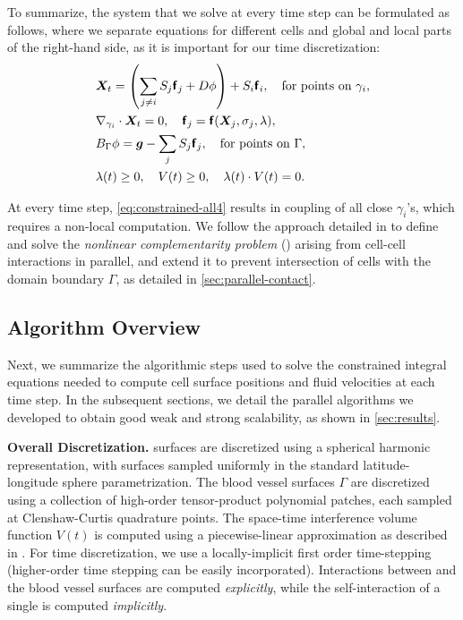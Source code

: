  To summarize, the system that we solve at every time step can be
 formulated as follows, where we separate equations for different
 cells and global and local parts of the right-hand side, as it is
 important for our time discretization:
%
%
\begin{align}
  &{\bm{X}}_t =  \left(\sum_{j\neq i} S_j \bm{\mathsf{f}}_j  + D \phi\right) +  S_i \bm{\mathsf{f}}_i, \quad \mbox{for points on $\gamma_i$},
  \label{eq:constrained-all1}\\
  &\nabla_{\gamma_i} \cdot {\bm{X}}_t = 0,\quad    \bm{\mathsf{f}}_j = \bm{\mathsf{f}}({\bm{X}}_j,\sigma_j,\lambda),
  \label{eq:constrained-all2} \\
  &B_\Gamma \phi =  \bm{g}-\sum_{j} S_j \bm{\mathsf{f}}_j, \quad \mbox{for points on $\Gamma$},
  \label{eq:constrained-all3} \\
   &\lambda(t) \geq 0, \quad V(t) \geq 0, \quad \lambda(t) \cdot V(t) = 0.
  \label{eq:constrained-all4}
\end{align}

 At every time step, \eqref{eq:constrained-all4} results in 
coupling of all close $\gamma_i$'s, which requires a non-local computation. 
We follow the approach detailed in \cite{lu2018parallel, lu2017} to define and solve
the \textit{nonlinear complementarity problem} (\ncp) arising from cell-cell
interactions in parallel, and extend it to prevent intersection of cells
with the domain boundary $\Gamma$, as detailed in \cref{sec:parallel-contact}.


\subsection{Algorithm Overview\label{sec:alg_overview}}

Next, we summarize the algorithmic steps used to solve the constrained
integral equations needed to compute cell surface positions and fluid velocities
at each time step.  In the subsequent sections, we detail the
parallel algorithms we developed to obtain good weak and strong scalability, as shown
in \cref{sec:results}.


\textbf{Overall Discretization. } 
\rbc surfaces are discretized using a spherical harmonic
representation, with surfaces sampled uniformly in the standard
latitude-longitude sphere parametrization. The blood vessel surfaces $\Gamma$ are
discretized using a collection of high-order tensor-product polynomial
patches, each sampled at Clenshaw-Curtis quadrature points. The
space-time interference volume function $V(t)$ is computed using a
piecewise-linear approximation as described in \cite{lu2018parallel}.
For time discretization, we use a locally-implicit first order
time-stepping (higher-order time stepping can be easily incorporated).
Interactions between \rbcs and the blood vessel surfaces are computed
\textit{explicitly}, while the self-interaction of a single \rbc is
computed \textit{implicitly}.

